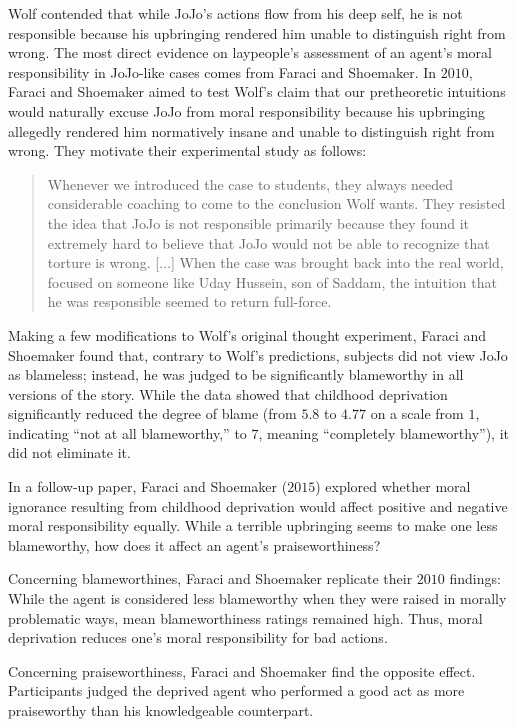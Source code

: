 \documentclass[scrarticle]{scrartcl}
\begin{document}
Wolf contended that while JoJo's actions flow from his deep self, he is not responsible because his upbringing rendered him unable to distinguish right from wrong.
The most direct evidence on laypeople's assessment of an agent's moral responsibility in JoJo-like cases comes from Faraci and Shoemaker.
In $2010$, Faraci and Shoemaker aimed to test Wolf's claim that our pretheoretic intuitions would naturally excuse JoJo from moral responsibility because his upbringing allegedly rendered him normatively insane and unable to distinguish right from wrong.
They motivate their experimental study as follows:

\begin{quote}
   Whenever we introduced the case to students, they always needed considerable coaching to come to the conclusion Wolf wants.
   They resisted the idea that JoJo is not responsible primarily because they found it extremely hard to believe that JoJo would not be able to recognize that torture is wrong. [$\ldots$]
   When the case was brought back into the real world, focused on someone like Uday Hussein, son of Saddam, the intuition that he was responsible seemed to return full-force.
\end{quote}

Making a few modifications to Wolf's original thought experiment, Faraci and Shoemaker found that, contrary to Wolf's predictions, subjects did not view JoJo as blameless; instead, he was judged to be significantly blameworthy in all versions of the story.
While the data showed that childhood deprivation significantly reduced the degree of blame (from $5.8$ to $4.77$ on a scale from $1$, indicating \enquote{not at all blameworthy,} to $7$, meaning \enquote{completely blameworthy}), it did not eliminate it.

In a follow-up paper, Faraci and Shoemaker ($2015$) explored whether moral ignorance resulting from childhood deprivation would affect positive and negative moral responsibility equally.
While a terrible upbringing seems to make one less blameworthy, how does it affect an agent's praiseworthiness?

Concerning blameworthines, Faraci and Shoemaker replicate their $2010$ findings:
While the agent is considered less blameworthy when they were raised in morally problematic ways, mean blameworthiness ratings remained high.
Thus, moral deprivation reduces one's moral responsibility for bad actions.

Concerning praiseworthiness, Faraci and Shoemaker find the opposite effect.
Participants judged the deprived agent who performed a good act as more praiseworthy than his knowledgeable counterpart.
\end{document}
